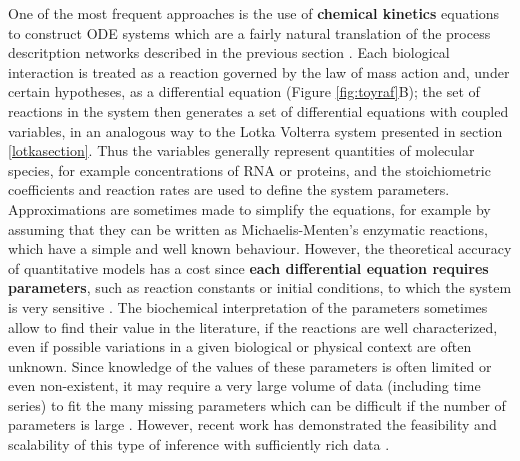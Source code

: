 \documentclass[a4paper,12pt,twoside,onecolumn,openright,final,oldfontcommands]{memoir}
\begin{document}
One of the most frequent approaches is the use of \textbf{chemical
kinetics} equations to construct ODE systems which are a fairly natural
translation of the process descritption networks described in the
previous section \citep{polynikis2009comparing}. Each biological
interaction is treated as a reaction governed by the law of mass action
and, under certain hypotheses, as a differential equation (Figure
\ref{fig:toyraf}B); the set of reactions in the system then generates a
set of differential equations with coupled variables, in an analogous
way to the Lotka Volterra system presented in section
\ref{lotkasection}. Thus the variables generally represent quantities of
molecular species, for example concentrations of RNA or proteins, and
the stoichiometric coefficients and reaction rates are used to define
the system parameters. Approximations are sometimes made to simplify the
equations, for example by assuming that they can be written as
Michaelis-Menten's enzymatic reactions, which have a simple and well
known behaviour. However, the theoretical accuracy of quantitative
models has a cost since \textbf{each differential equation requires
parameters}, such as reaction constants or initial conditions, to which
the system is very sensitive \citep{le2015quantitative}. The biochemical
interpretation of the parameters sometimes allow to find their value in
the literature, if the reactions are well characterized, even if
possible variations in a given biological or physical context are often
unknown. Since knowledge of the values of these parameters is often
limited or even non-existent, it may require a very large volume of data
(including time series) to fit the many missing parameters which can be
difficult if the number of parameters is large
\citep{villaverde2014reverse}. However, recent work has demonstrated the
feasibility and scalability of this type of inference with sufficiently
rich data \citep{frohlich2018efficient}.
\end{document}
